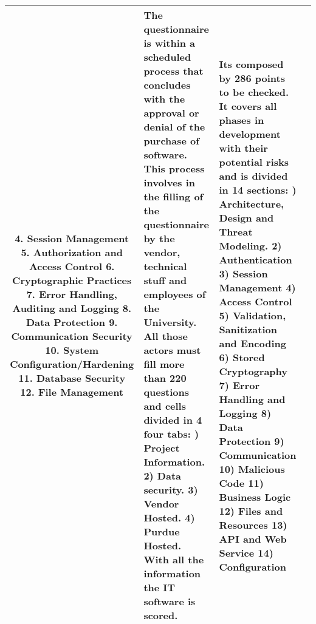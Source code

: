 \documentclass[paper=letter, fontsize=12pt]{article}
\begin{document}
\begin{landscape}
\begin{longtable}{| c | L{7cm} | L{7cm} | L{7cm} |}
	4. Session Management
	5. Authorization and Access Control 
	6. Cryptographic Practices
	7. Error Handling, Auditing and Logging
	8. Data Protection
	9. Communication Security
	10. System Configuration/Hardening
	11. Database Security
	12. File Management & The questionnaire is within a scheduled process that concludes with the approval or denial of the purchase of software. This process involves in the filling of the questionnaire by the vendor, technical stuff and employees of the University. All those actors must fill  \textbf{more than 220 questions} and cells divided in 4 four tabs: ) Project Information. 2) Data security. 3) Vendor Hosted. 4){ Purdue Hosted. \newline}  \newline With all the information the IT software is scored.  &  Its composed by  \textbf{286 points to be checked}. It covers all phases in development with their potential risks and is divided in 14 sections: ) Architecture, Design and Threat Modeling. 2) Authentication 3) Session Management 4) Access Control 5) Validation, Sanitization and Encoding 6) Stored Cryptography 7) Error Handling and Logging 8) Data Protection 9) Communication 10) Malicious Code 11) Business Logic	12) Files and Resources 13) API and Web Service 14) Configuration\\
            \hline

\end{longtable}
\end{landscape}
\end{document}
